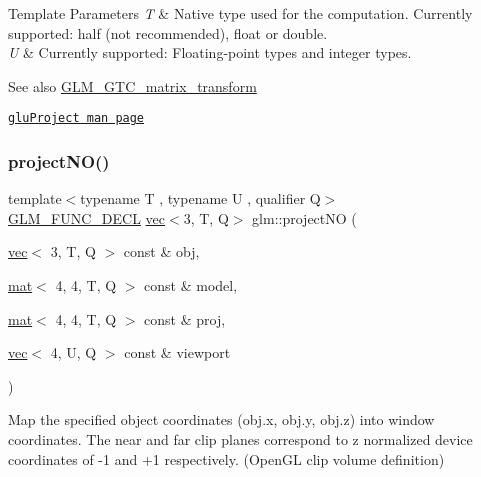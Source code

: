 \begin{DoxyTemplParams}{Template Parameters}
{\em T} & Native type used for the computation. Currently supported\+: half (not recommended), float or double. \\
\hline
{\em U} & Currently supported\+: Floating-\/point types and integer types. \\
\hline
\end{DoxyTemplParams}
\begin{DoxySeeAlso}{See also}
\mbox{\hyperlink{group__gtc__matrix__transform}{G\+L\+M\+\_\+\+G\+T\+C\+\_\+matrix\+\_\+transform}} 

\href{https://www.khronos.org/registry/OpenGL-Refpages/gl2.1/xhtml/gluProject.xml}{\tt glu\+Project man page} 
\end{DoxySeeAlso}
\mbox{\label{group__gtc__matrix__transform_ga05249751f48d14cb282e4979802b8111}} 
\subsubsection{\texorpdfstring{project\+N\+O()}{projectNO()}}
{\footnotesize\ttfamily template$<$typename T , typename U , qualifier Q$>$ \\
\mbox{\hyperlink{setup_8hpp_ab2d052de21a70539923e9bcbf6e83a51}{G\+L\+M\+\_\+\+F\+U\+N\+C\+\_\+\+D\+E\+CL}} \mbox{\hyperlink{structglm_1_1vec}{vec}}$<$3, T, Q$>$ glm\+::project\+NO (\begin{DoxyParamCaption}\item[{\mbox{\hyperlink{structglm_1_1vec}{vec}}$<$ 3, T, Q $>$ const \&}]{obj,  }\item[{\mbox{\hyperlink{structglm_1_1mat}{mat}}$<$ 4, 4, T, Q $>$ const \&}]{model,  }\item[{\mbox{\hyperlink{structglm_1_1mat}{mat}}$<$ 4, 4, T, Q $>$ const \&}]{proj,  }\item[{\mbox{\hyperlink{structglm_1_1vec}{vec}}$<$ 4, U, Q $>$ const \&}]{viewport }\end{DoxyParamCaption})}

Map the specified object coordinates (obj.\+x, obj.\+y, obj.\+z) into window coordinates. The near and far clip planes correspond to z normalized device coordinates of -\/1 and +1 respectively. (Open\+GL clip volume definition)


